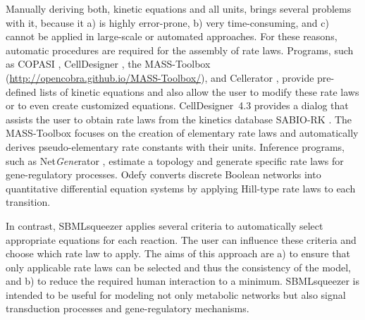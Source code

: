 \documentclass{bioinfo}
\begin{document}
Manually deriving both, kinetic equations and all units, brings several problems with it, because it
a) is highly error-prone, %
b) very time-consuming, and
c) cannot be applied in large-scale or automated approaches.
For these reasons, %
automatic procedures are required for the assembly of rate laws.
Programs, such as
COPASI \citep{Hoops2006}, 
CellDesigner \citep{Funahashi2007}, %
the MASS-Toolbox (\url{http://opencobra.github.io/MASS-Toolbox/}), and 
Cellerator \citep{Shapiro2002}, 
provide pre-defined lists of kinetic equations and also allow the user to modify these rate laws or to even create customized equations.
CellDesigner~4.3 %
provides a dialog that assists the user to obtain rate laws from the kinetics database SABIO-RK \citep{Wittig2012}.
The MASS-Toolbox focuses on the creation of elementary rate laws and automatically derives pseudo-elementary rate constants with their units.
Inference programs, such as Net\emph{Gene}rator \citep{Weber2013}, estimate a topology and generate specific rate laws  for gene-regulatory processes. 
Odefy \citep{Krumsiek2010} converts discrete Boolean networks into quantitative differential equation systems by applying Hill-type rate laws to each transition. %

In contrast, SBMLsqueezer applies several criteria to automatically select appropriate equations for each reaction.
The user can influence these criteria %
and choose which rate law to apply.
The aims of this approach are
a) to ensure that only applicable rate laws can be selected and thus the consistency of the model, and
b) to reduce the required human interaction to a minimum.
SBMLsqueezer is intended to be useful for modeling not only metabolic networks but also signal transduction processes and gene-regulatory mechanisms.
\end{document}
